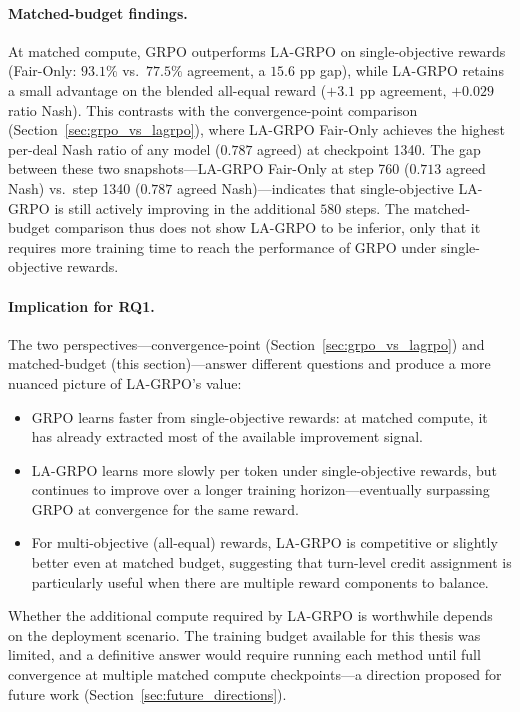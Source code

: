 \documentclass[12pt,a4paper]{article}
\begin{document}
\paragraph{Matched-budget findings.} At matched compute, GRPO outperforms LA-GRPO on single-objective rewards (Fair-Only: $93.1\%$ vs.\ $77.5\%$ agreement, a $15.6$ pp gap), while LA-GRPO retains a small advantage on the blended all-equal reward ($+3.1$ pp agreement, $+0.029$ ratio Nash). This contrasts with the convergence-point comparison (Section~\ref{sec:grpo_vs_lagrpo}), where LA-GRPO Fair-Only achieves the highest per-deal Nash ratio of any model ($0.787$ agreed) at checkpoint 1340. The gap between these two snapshots---LA-GRPO Fair-Only at step 760 ($0.713$ agreed Nash) vs.\ step 1340 ($0.787$ agreed Nash)---indicates that single-objective LA-GRPO is still actively improving in the additional $580$ steps. The matched-budget comparison thus does not show LA-GRPO to be inferior, only that it requires more training time to reach the performance of GRPO under single-objective rewards.

\paragraph{Implication for RQ1.} The two perspectives---convergence-point (Section~\ref{sec:grpo_vs_lagrpo}) and matched-budget (this section)---answer different questions and produce a more nuanced picture of LA-GRPO's value:
\begin{itemize}
    \item GRPO learns faster from single-objective rewards: at matched compute, it has already extracted most of the available improvement signal.
    \item LA-GRPO learns more slowly per token under single-objective rewards, but continues to improve over a longer training horizon---eventually surpassing GRPO at convergence for the same reward.
    \item For multi-objective (all-equal) rewards, LA-GRPO is competitive or slightly better even at matched budget, suggesting that turn-level credit assignment is particularly useful when there are multiple reward components to balance.
\end{itemize}
Whether the additional compute required by LA-GRPO is worthwhile depends on the deployment scenario. The training budget available for this thesis was limited, and a definitive answer would require running each method until full convergence at multiple matched compute checkpoints---a direction proposed for future work (Section~\ref{sec:future_directions}).
\end{document}
